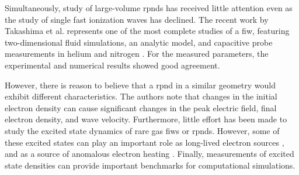 Simultaneously, study of large-volume \acs{rpnd}s has received little attention
even as the study of single fast ionization waves has declined. The recent work
by Takashima et al. represents one of the most complete studies of a \acs{fiw},
featuring two-dimensional fluid simulations, an analytic model, and capacitive
probe measurements in helium and nitrogen \cite{Takashima2011}. For the measured
parameters, the experimental and numerical results showed good agreement.

However, there is reason to believe that a \acs{rpnd} in a similar geometry
would exhibit different characteristics. The authors note that changes in the
initial electron density can cause significant changes in the peak electric
field, final electron density, and wave velocity. Furthermore, little effort has
been made to study the excited state dynamics of rare gas \acs{fiw}s or
\acs{rpnd}s. However, some of these excited states can play an important role as
long-lived electron sources \cite{Nersisyan2004}, and as a source of anomalous
electron heating \cite{Wells1973}. Finally, measurements of excited state
densities can provide important benchmarks for computational simulations.
